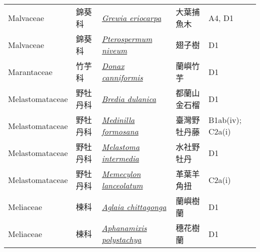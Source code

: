 {\begin{longtable}{L{2.5cm}L{2cm}L{5cm}L{2.5cm}L{3cm}}
    Malvaceae & 錦葵科 & \href{http://www.theplantlist.org/tpl1.1/search?q=Grewia+eriocarpa}{\textit{Grewia eriocarpa} } & 大葉捕魚木 & A4, D1    \\
    Malvaceae & 錦葵科 & \href{http://www.theplantlist.org/tpl1.1/search?q=Pterospermum+niveum}{\textit{Pterospermum niveum} } & 翅子樹 & D1    \\
    Marantaceae & 竹芋科 & \href{http://www.theplantlist.org/tpl1.1/search?q=Donax+canniformis}{\textit{Donax canniformis} } & 蘭嶼竹芋 & D1    \\
    Melastomataceae & 野牡丹科 & \href{http://www.theplantlist.org/tpl1.1/search?q=Bredia+dulanica}{\textit{Bredia dulanica} } & 都蘭山金石榴 & D1    \\
    Melastomataceae & 野牡丹科 & \href{http://www.theplantlist.org/tpl1.1/search?q=Medinilla+formosana}{\textit{Medinilla formosana} } & 臺灣野牡丹藤 & B1ab(iv); C2a(i)    \\
    Melastomataceae & 野牡丹科 & \href{http://www.theplantlist.org/tpl1.1/search?q=Melastoma+intermedia}{\textit{Melastoma intermedia} } & 水社野牡丹 & D1    \\
    Melastomataceae & 野牡丹科 & \href{http://www.theplantlist.org/tpl1.1/search?q=Memecylon+lanceolatum}{\textit{Memecylon lanceolatum} } & 革葉羊角扭 & C2a(i)    \\
    Meliaceae & 楝科 & \href{http://www.theplantlist.org/tpl1.1/search?q=Aglaia+chittagonga}{\textit{Aglaia chittagonga} } & 蘭嶼樹蘭 & D1    \\
    Meliaceae & 楝科 & \href{http://www.theplantlist.org/tpl1.1/search?q=Aphanamixis+polystachya}{\textit{Aphanamixis polystachya} } & 穗花樹蘭 & D1    \\

\end{longtable}}
